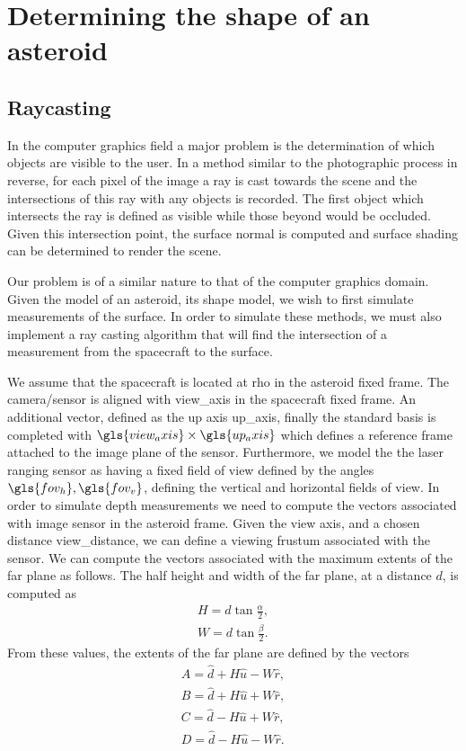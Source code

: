 
\chapter{Determining the shape of an asteroid}

\section{Raycasting}

In the computer graphics field a major problem is the determination of which objects are visible to the user.
In a method similar to the photographic process in reverse, for each pixel of the image a ray is cast towards the scene and the intersections of this ray with any objects is recorded.
The first object which intersects the ray is defined as visible while those beyond would be occluded.
Given this intersection point, the surface normal is computed and surface shading can be determined to render the scene.

Our problem is of a similar nature to that of the computer graphics domain.
Given the model of an asteroid, its shape model, we wish to first simulate measurements of the surface. 
In order to simulate these methods, we must also implement a ray casting algorithm that will find the intersection of a measurement from the spacecraft to the surface. 

We assume that the spacecraft is located at \gls{rho} in the asteroid fixed frame.
The camera/sensor is aligned with \gls{view_axis} in the spacecraft fixed frame.
An additional vector, defined as the up axis \gls{up_axis}, finally the standard basis is completed with \( \gls{view_axis} \times \gls{up_axis} \) which defines a reference frame attached to the image plane of the sensor.
Furthermore, we model the the laser ranging sensor as having a fixed field of view defined by the angles \( \gls{fov_h}, \gls{fov_v}\), defining the vertical and horizontal fields of view.
In order to simulate depth measurements we need to compute the vectors associated with image sensor in the asteroid frame. 
Given the view axis, and a chosen distance \gls{view_distance}, we can define a viewing \gls{frustum} associated with the sensor. 
We can compute the vectors associated with the maximum extents of the far plane as follows.
The half height and width of the far plane, at a distance \( d \), is computed as
\begin{align}
    H = d \tan \frac{\alpha}{2} , \\
    W = d \tan \frac{\beta}{2} .
\end{align}
From these values, the extents of the far plane are defined by the vectors
\begin{align}
    A = \hat d + H \hat u - W \hat r , \\
    B = \hat d + H \hat u + W \hat r, \\
    C = \hat d - H \hat  u + W \hat r, \\
    D = \hat d - H \hat u - W \hat r.
\end{align}

